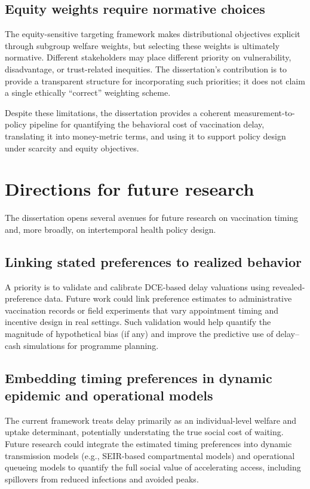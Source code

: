 \documentclass[doublespacing]{utdthesis}
\begin{document}
\subsection{Equity weights require normative choices}
The equity-sensitive targeting framework makes distributional objectives explicit through subgroup welfare weights, but selecting these weights is ultimately normative. Different stakeholders may place different priority on vulnerability, disadvantage, or trust-related inequities. The dissertation’s contribution is to provide a transparent structure for incorporating such priorities; it does not claim a single ethically ``correct'' weighting scheme.

Despite these limitations, the dissertation provides a coherent measurement-to-policy pipeline for quantifying the behavioral cost of vaccination delay, translating it into money-metric terms, and using it to support policy design under scarcity and equity objectives.


\section{Directions for future research}
\label{sec:dissertation_future_research}

The dissertation opens several avenues for future research on vaccination timing and, more broadly, on intertemporal health policy design.

\subsection{Linking stated preferences to realized behavior}
A priority is to validate and calibrate DCE-based delay valuations using revealed-preference data. Future work could link preference estimates to administrative vaccination records or field experiments that vary appointment timing and incentive design in real settings. Such validation would help quantify the magnitude of hypothetical bias (if any) and improve the predictive use of delay--cash simulations for programme planning.

\subsection{Embedding timing preferences in dynamic epidemic and operational models}
The current framework treats delay primarily as an individual-level welfare and uptake determinant, potentially understating the true social cost of waiting. Future research could integrate the estimated timing preferences into dynamic transmission models (e.g., SEIR-based compartmental models) and operational queueing models to quantify the full social value of accelerating access, including spillovers from reduced infections and avoided peaks. 
\end{document}
